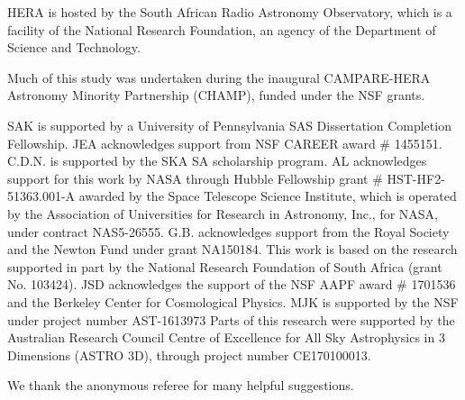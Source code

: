 \documentclass[twocolumn, trackchanges]{aastex61}
\begin{document}
HERA is hosted by the South African Radio Astronomy Observatory, which is a facility of the National Research Foundation, an agency of the Department of Science and Technology.

Much of this study was undertaken during the inaugural CAMPARE-HERA Astronomy Minority Partnership (CHAMP), funded under the NSF grants.

SAK is supported by a University of Pennsylvania SAS Dissertation Completion Fellowship.
JEA acknowledges support from NSF CAREER award \# 1455151.
C.D.N. is supported by the SKA SA scholarship program.
AL acknowledges support for this work by NASA through Hubble Fellowship grant \# HST-HF2-51363.001-A awarded by the Space Telescope Science Institute, which is operated by the Association of Universities for Research in Astronomy, Inc., for NASA, under contract NAS5-26555.
G.B. acknowledges support from the Royal Society and the Newton Fund under grant NA150184. This work is based on the research supported in part by the National Research Foundation of South Africa (grant No. 103424).
JSD acknowledges the support of the NSF AAPF award \# 1701536 and the Berkeley Center for Cosmological Physics.
MJK is supported by the NSF under project number AST-1613973
Parts of this research were supported by the Australian Research
Council Centre of Excellence for All Sky Astrophysics in 3 Dimensions
(ASTRO 3D), through project number CE170100013.

We thank the anonymous referee for many helpful suggestions.


\clearpage



\end{document}
